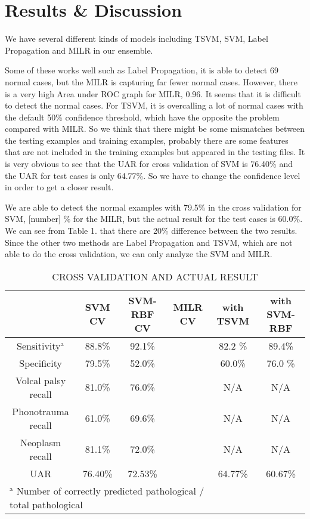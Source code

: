 \section{Results \& Discussion}


We have several different kinds of models including TSVM, SVM, Label Propagation and MILR in our ensemble. 

Some of these works well such as Label Propagation, it is able to detect 69 normal cases, but the MILR is capturing far fewer normal cases. However, there is a very high Area under ROC graph for MILR, 0.96. It seems that it is difficult to detect the normal cases. For TSVM, it is overcalling a lot of normal cases with the default 50\% confidence threshold, which have the opposite the problem compared with MILR. So we think that there might be some mismatches between the testing examples and training examples, probably there are some features that are not included in the training examples but appeared in the testing files. It is very obvious to see that the UAR for cross validation of SVM is 76.40\% and the UAR for test cases is only 64.77\%. So we have to change the confidence level in order to get a closer result.

We are able to detect the normal examples with 79.5\% in the cross validation for SVM, [number] \% for the MILR, but the actual result for the test cases is 60.0\%. We can see from Table 1. that there are 20\% difference between the two results. Since the other two methods are Label Propagation and TSVM, which are not able to do the cross validation, we can only analyze the SVM and MILR.


\begin{table*}[!htbp]
	\caption{CROSS VALIDATION AND ACTUAL RESULT}
	\begin{center}
		\begin{tabular}{|c|c|c|c|c|c|}
			\hline
			 & SVM CV & SVM-RBF CV & MILR CV & with TSVM & with SVM-RBF \\
			\hline
			Sensitivity$^{\mathrm{a}}$  & 88.8\%& 92.1\% & & 82.2 \% & 89.4\% \\
			\hline
			Specificity & 79.5\% & 52.0\%&& 60.0\% & 76.0 \% \\
			\hline
			Volcal palsy recall & 81.0\% &76.0\%& & N/A & N/A \\
			\hline
			Phonotrauma recall & 61.0\% &69.6\%&& N/A& N/A\\
			\hline
			Neoplasm recall & 81.1\% & 72.0\%&& N/A& N/A \\
			\hline
			UAR & 76.40\% &72.53\% & & 64.77\% & 60.67\%\\
			\hline
			\multicolumn{4}{l}{$^{\mathrm{a}}$ Number of correctly predicted pathological / total pathological}
		\end{tabular}
		\label{tab2}
	\end{center}
\end{table*}

